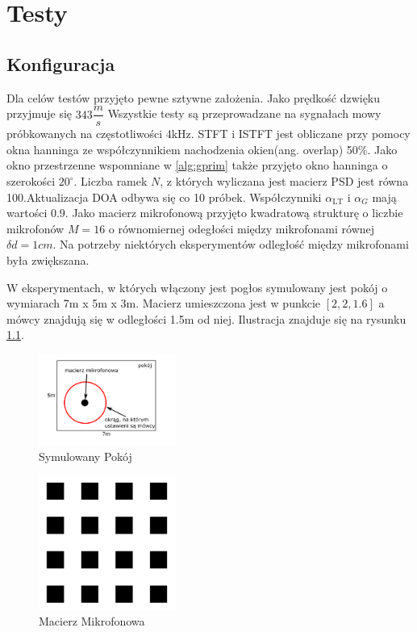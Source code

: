 \chapter{Testy}
\label{chapter-5}
\section{Konfiguracja}
Dla celów testów przyjęto pewne sztywne założenia. Jako prędkość dzwięku przyjmuje się $343 \dfrac{m}{s}$ Wszystkie testy są przeprowadzane na sygnałach mowy próbkowanych na częstotliwości 4kHz. STFT i ISTFT jest obliczane przy pomocy okna hanninga \cite{hann} ze współczynnikiem nachodzenia okien(ang. overlap) 50$\%$. Jako okno przestrzenne wspomniane w \ref{alg:gprim} także przyjęto okno hanninga o szerokości $20^{\circ}$. Liczba ramek $N$, z których wyliczana jest macierz PSD jest równa 100.Aktualizacja DOA odbywa się co 10 próbek. Współczynniki $\alpha_{\mathrm{LT}}$ i $\alpha_{G}$ mają wartości 0.9. Jako macierz mikrofonową przyjęto kwadratową strukturę o liczbie mikrofonów $M=16$ o równomiernej odegłości między mikrofonami równej $\delta d = 1cm$. Na potrzeby niektórych eksperymentów odległość między mikrofonami była zwiększana.

W eksperymentach, w których włączony jest pogłos symulowany jest pokój o wymiarach 7m x 5m x 3m. Macierz umieszczona jest w punkcie $[2,2,1.6]$ a mówcy znajdują się w odległości 1.5m od niej. Ilustracja znajduje się na rysunku \ref{fig:room}.

\begin{figure}[h!]
    \centering
    \includegraphics[width=0.4\textwidth]{Images/room.png}
    \caption{Symulowany Pokój}
    \label{fig:room}
\end{figure}

\begin{figure}[h!]
    \centering
    \includegraphics[width=0.4\textwidth]{Images/microphone.png}
    \caption{Macierz Mikrofonowa}
    \label{fig:microphone}
\end{figure}


